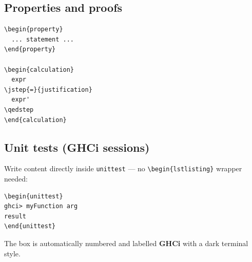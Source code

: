 \subsection*{Properties and proofs}
\begin{verbatim}
\begin{property}
  ... statement ...
\end{property}

\begin{calculation}
  expr
\jstep{=}{justification}
  expr'
\qedstep
\end{calculation}
\end{verbatim}

\subsection*{Unit tests (GHCi sessions)}
Write content directly inside \texttt{unittest} — no \verb|\begin{lstlisting}| wrapper needed:
\begin{verbatim}
\begin{unittest}
ghci> myFunction arg
result
\end{unittest}
\end{verbatim}
The box is automatically numbered and labelled \textbf{GHCi} with a dark
terminal style.
